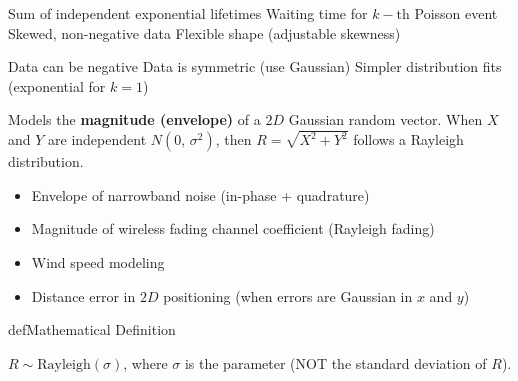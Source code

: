 
\PSyes{} Sum of independent exponential lifetimes\PSbr{}\PSyes{} Waiting time for $k-\mathrm{th}$ Poisson event\PSbr{}\PSyes{} Skewed, non-negative data\PSbr{}\PSyes{} Flexible shape (adjustable skewness)


\PSno{} Data can be negative\PSbr{}\PSno{} Data is symmetric (use Gaussian)\PSbr{}\PSno{} Simpler distribution fits (exponential for $k = 1$)



Models the \textbf{magnitude (envelope)} of a $2D$ Gaussian random vector. When $X$ and $Y$ are independent $N(0,\, \sigma^{2})$, then $R = \sqrt{X^{2} + Y^{2}}$ follows a Rayleigh distribution.


\begin{itemize}
\tightlist
\item
  Envelope of narrowband noise (in-phase + quadrature)
\item
  Magnitude of wireless fading channel coefficient (Rayleigh fading)
\item
  Wind speed modeling
\item
  Distance error in $2D$ positioning (when errors are Gaussian in $x$ and $y$)
\end{itemize}

\begin{PSbox}[unbreakable]{def}{Mathematical Definition}

$R \sim \mathrm{Rayleigh}(\sigma)$, where $\sigma$ is the parameter (NOT the standard deviation of $R$).

\end{PSbox}









